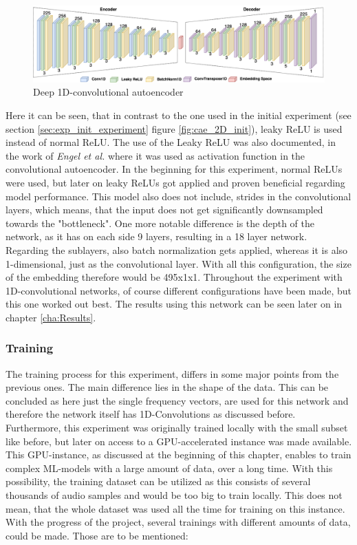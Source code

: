  \begin{figure}[htb!]
	\caption{Deep 1D-convolutional autoencoder}
	\label{fig:cae_1D}
	\centering
	\includegraphics[width=\textwidth]{images/experiments/autoencoder_deep_1D.png}
\end{figure}

Here it can be seen, that in contrast to the one used in the initial experiment (see section \ref{sec:exp_init_experiment} figure \ref{fig:cae_2D_init}), leaky ReLU is used instead of normal ReLU. The use of the Leaky ReLU was also documented, in the work of \textit{Engel et al.} \cite{Engel2017} where it was used as activation function in the convolutional autoencoder. In the beginning for this experiment, normal ReLUs were used, but later on leaky ReLUs got applied and proven beneficial regarding model performance. This model also does not include, strides in the convolutional layers, which means, that the input does not get significantly downsampled towards the "bottleneck". One more notable difference is the depth of the network, as it has on each side 9 layers, resulting in a 18 layer network. Regarding the sublayers, also batch normalization gets applied, whereas it is also 1-dimensional, just as the convolutional layer. With all this configuration, the size of the embedding therefore would be 495x1x1. Throughout the experiment with 1D-convolutional networks, of course different configurations have been made, but this one worked out best. The results using this network can be seen later on in chapter \ref{cha:Results}.

\subsubsection{Training}
The training process for this experiment, differs in some major points from the previous ones. The main difference lies in the shape of the data. This can be concluded as here just the single frequency vectors, are used for this network and therefore the network itself has 1D-Convolutions as discussed before. Furthermore, this experiment was originally trained locally with the small subset like before, but later on access to a GPU-accelerated instance was made available. This GPU-instance, as discussed at the beginning of this chapter, enables to train complex ML-models with a large amount of data, over a long time. With this possibility, the training dataset can be utilized as this consists of several thousands of audio samples and would be too big to train locally. This does not mean, that the whole dataset was used all the time for training on this instance. With the progress of the project, several trainings with different amounts of data, could be made. Those are to be mentioned:

